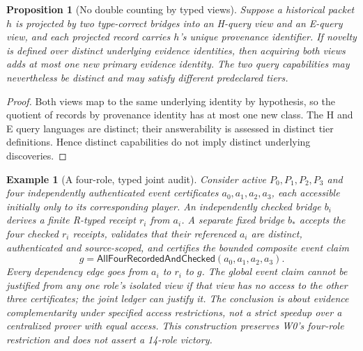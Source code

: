 \documentclass[11pt,letterpaper]{article}
\newtheorem{proposition}[theorem]{Proposition}
\newtheorem{example}[theorem]{Example}
\begin{document}
\begin{proposition}[No double counting by typed views]\label{prop:nodouble}
Suppose a historical packet $h$ is projected by two type-correct bridges into an H-query view and an E-query view, and each projected record carries $h$'s unique provenance identifier. If novelty is defined over distinct underlying evidence identities, then acquiring both views adds at most one new primary evidence identity. The two \emph{query capabilities} may nevertheless be distinct and may satisfy different predeclared tiers.
\end{proposition}
\begin{proof}
Both views map to the same underlying identity by hypothesis, so the quotient of records by provenance identity has at most one new class. The H and E query languages are distinct; their answerability is assessed in distinct tier definitions. Hence distinct capabilities do not imply distinct underlying discoveries.
\end{proof}

\begin{example}[A four-role, typed joint audit]
Consider active $P_0,P_1,P_2,P_3$ and four independently authenticated event certificates $a_0,a_1,a_2,a_3$, each accessible initially only to its corresponding player. An independently checked bridge $b_i$ derives a finite R-typed receipt $r_i$ from $a_i$. A separate fixed bridge $b_*$ accepts the four checked $r_i$ receipts, validates that their referenced $a_i$ are distinct, authenticated and source-scoped, and certifies the bounded composite event claim
\[
g=\mathsf{AllFourRecordedAndChecked}(a_0,a_1,a_2,a_3).
\]
Every dependency edge goes from $a_i$ to $r_i$ to $g$. The global event claim cannot be justified from any one role's isolated view if that view has no access to the other three certificates; the joint ledger can justify it. The conclusion is about \emph{evidence complementarity under specified access restrictions}, not a strict speedup over a centralized prover with equal access. This construction preserves W0's four-role restriction and does not assert a 14-role victory.
\end{example}
\end{document}

